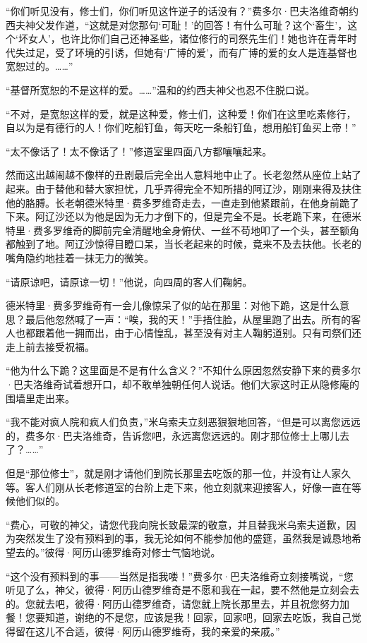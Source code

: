 \par “你们听见没有，修士们，你们听见这忤逆子的话没有？”费多尔·巴夫洛维奇朝约西夫神父发作道，“这就是对您那句‘可耻！’的回答！有什么可耻？这个‘畜生’，这个‘坏女人’，也许比你们自己还神圣些，诸位修行的司祭先生们！她也许在青年时代失过足，受了环境的引诱，但她有‘广博的爱’，而有广博的爱的女人是连基督也宽恕过的。……”
\par “基督所宽恕的不是这样的爱。……”温和的约西夫神父也忍不住脱口说。
\par “不对，是宽恕这样的爱，就是这种爱，修士们，这种爱！你们在这里吃素修行，自以为是有德行的人！你们吃船钉鱼，每天吃一条船钉鱼，想用船钉鱼买上帝！”
\par “太不像话了！太不像话了！”修道室里四面八方都嚷嚷起来。
\par 然而这出越闹越不像样的丑剧最后完全出人意料地中止了。长老忽然从座位上站了起来。由于替他和替大家担忧，几乎弄得完全不知所措的阿辽沙，刚刚来得及扶住他的胳膊。长老朝德米特里·费多罗维奇走去，一直走到他紧跟前，在他身前跪了下来。阿辽沙还以为他是因为无力才倒下的，但是完全不是。长老跪下来，在德米特里·费多罗维奇的脚前完全清醒地全身俯伏、一丝不苟地叩了一个头，甚至额角都触到了地。阿辽沙惊得目瞪口呆，当长老起来的时候，竟来不及去扶他。长老的嘴角隐约地挂着一抹无力的微笑。
\par “请原谅吧，请原谅一切！”他说，向四周的客人们鞠躬。
\par 德米特里·费多罗维奇有一会儿像惊呆了似的站在那里：对他下跪，这是什么意思？最后他忽然喊了一声：“唉，我的天！”手捂住脸，从屋里跑了出去。所有的客人也都跟着他一拥而出，由于心情惶乱，甚至没有对主人鞠躬道别。只有司祭们还走上前去接受祝福。
\par “他为什么下跪？这里面是不是有什么含义？”不知什么原因忽然安静下来的费多尔·巴夫洛维奇试着想开口，却不敢单独朝任何人说话。他们大家这时正从隐修庵的围墙里走出来。
\par “我不能对疯人院和疯人们负责，”米乌索夫立刻恶狠狠地回答，“但是可以离您远远的，费多尔·巴夫洛维奇，告诉您吧，永远离您远远的。刚才那位修士上哪儿去了？……”
\par 但是“那位修士”，就是刚才请他们到院长那里去吃饭的那一位，并没有让人家久等。客人们刚从长老修道室的台阶上走下来，他立刻就来迎接客人，好像一直在等候他们似的。
\par “费心，可敬的神父，请您代我向院长致最深的敬意，并且替我米乌索夫道歉，因为突然发生了没有预料到的事，我无论如何不能参加他的盛筵，虽然我是诚恳地希望去的。”彼得·阿历山德罗维奇对修士气恼地说。
\par “这个没有预料到的事——当然是指我喽！”费多尔·巴夫洛维奇立刻接嘴说，“您听见了么，神父，彼得·阿历山德罗维奇是不愿和我在一起，要不然他是立刻会去的。您就去吧，彼得·阿历山德罗维奇，请您就上院长那里去，并且祝您努力加餐！您要知道，谢绝的不是您，应该是我！回家，回家吧，回家去吃饭，我自己觉得留在这儿不合适，彼得·阿历山德罗维奇，我的亲爱的亲戚。”
